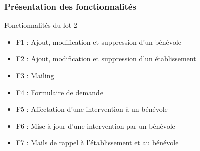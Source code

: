 \speaker{\Francois}

\begin{frame}
\frametitle{Présentation des fonctionnalités}
\begin{block}{Fonctionnalités du lot 2}
	\begin{itemize}
		\item F1 : Ajout, modification et suppression d'un bénévole
		\item F2 : Ajout, modification et suppression d'un établissement
		\item F3 : Mailing
		\item F4 : Formulaire de demande
		\item F5 : Affectation d'une intervention à un bénévole
		\item F6 : Mise à jour d'une intervention par un bénévole
		\item F7 : Mails de rappel à l'établissement et au bénévole
	\end{itemize}
\end{block}
\end{frame}

